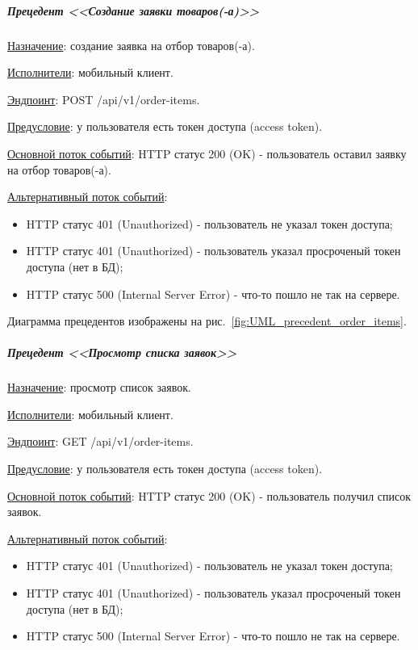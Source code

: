 
\subparagraph{Прецедент <<Создание заявки товаров(-а)>>} \hspace{0pt}

\underline{Назначение}: создание заявка на отбор товаров(-а).

\underline{Исполнители}: мобильный клиент.

\underline{Эндпоинт}: POST /api/v1/order-items.

\underline{Предусловие}: у пользователя есть токен доступа (access token).

\underline{Основной поток событий}: HTTP статус 200 (OK) - пользователь оставил заявку на отбор товаров(-а). 

\underline{Альтернативный поток событий}:

\begin{itemize}
    \item HTTP статус 401 (Unauthorized) - пользователь не указал токен доступа;
    \item HTTP статус 401 (Unauthorized) - пользователь указал просроченый токен доступа (нет в БД);
    \item HTTP статус 500 (Internal Server Error) - что-то пошло не так на сервере.
\end{itemize}

Диаграмма прецедентов изображены на рис.~\ref{fig:UML_precedent_order_items}.


\subparagraph{Прецедент <<Просмотр списка заявок>>} \hspace{0pt}

\underline{Назначение}: просмотр список заявок.

\underline{Исполнители}: мобильный клиент.

\underline{Эндпоинт}: GET /api/v1/order-items.

\underline{Предусловие}: у пользователя есть токен доступа (access token).

\underline{Основной поток событий}: HTTP статус 200 (OK) - пользователь получил список заявок. 

\underline{Альтернативный поток событий}:

\begin{itemize}
    \item HTTP статус 401 (Unauthorized) - пользователь не указал токен доступа;
    \item HTTP статус 401 (Unauthorized) - пользователь указал просроченый токен доступа (нет в БД);
    \item HTTP статус 500 (Internal Server Error) - что-то пошло не так на сервере.
\end{itemize}

